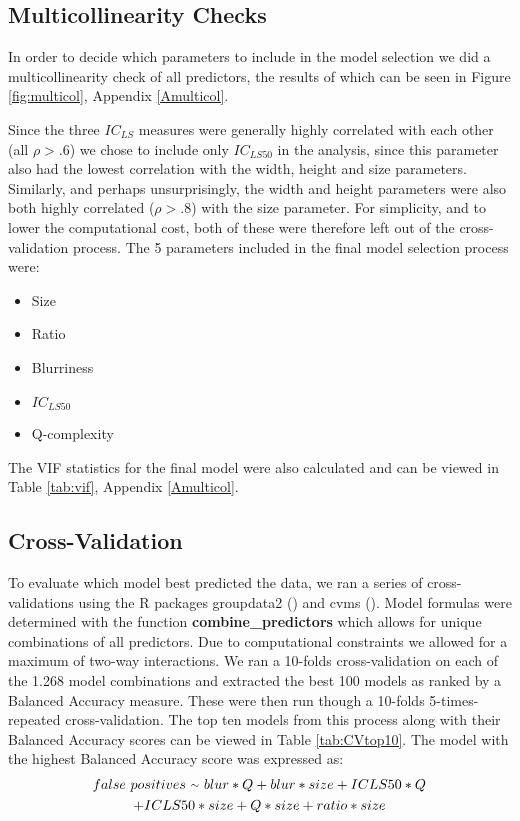 \documentclass[12pt]{article}
\newcommand{\mytilde}{\raise.17ex\hbox{$\scriptstyle\mathtt{\sim}$}} %
\begin{document}
\subsection{Multicollinearity Checks}
In order to decide which parameters to include in the model selection we did a multicollinearity check of all predictors, the results of which can be seen in Figure \ref{fig:multicol}, Appendix \ref{Amulticol}.

Since the three $IC_{LS}$ measures were generally highly correlated with each other (all $\rho > .6$) we chose to include only $IC_{LS50}$ in the analysis, since this parameter also had the lowest correlation with the width, height and size parameters. 
Similarly, and perhaps unsurprisingly, the width and height parameters were also both highly correlated ($\rho > .8$) with the size parameter. For simplicity, and to lower the computational cost, both of these were therefore left out of the cross-validation process.
The 5 parameters included in the final model selection process were:
\begin{itemize}
	\item Size
	\item Ratio
	\item Blurriness
	\item $IC_{LS50}$
	\item Q-complexity
\end{itemize}

The VIF statistics for the final model were also calculated and can be viewed in Table \ref{tab:vif}, Appendix \ref{Amulticol}.

\subsection{Cross-Validation}
To evaluate which model best predicted the data, we ran a series of cross-validations using the R packages groupdata2 (\cite{olsenGroupdata22020}) and cvms (\cite{olsenCvms2020}).
Model formulas were determined with the function \textbf{combine\_predictors} which allows for unique combinations of all predictors. Due to computational constraints we allowed for a maximum of two-way interactions. We ran a 10-folds cross-validation on each of the 1.268 model combinations and extracted the best 100 models as ranked by a Balanced Accuracy measure. These were then run though a 10-folds 5-times-repeated cross-validation. The top ten models from this process along with their Balanced Accuracy scores can be viewed in Table \ref{tab:CVtop10}. The model with the highest Balanced Accuracy score was expressed as:
\begin{multline*}
		 false \ positives \ \mytilde \ blur*Q + blur*size + ICLS50*Q\\
		  + ICLS50*size + Q*size + ratio*size
	\label{eq:bestmodel}
\end{multline*} 
\end{document}
